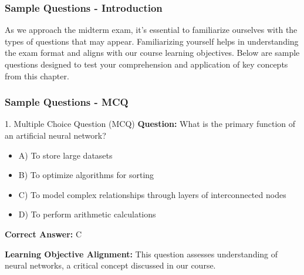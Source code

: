 \documentclass[aspectratio=169]{beamer}
\begin{document}
\begin{frame}[fragile]
    \frametitle{Sample Questions - Introduction}
    As we approach the midterm exam, it's essential to familiarize ourselves with the types of questions that may appear. Familiarizing yourself helps in understanding the exam format and aligns with our course learning objectives. Below are sample questions designed to test your comprehension and application of key concepts from this chapter.
\end{frame}

\begin{frame}[fragile]
    \frametitle{Sample Questions - MCQ}
    \begin{block}{1. Multiple Choice Question (MCQ)}
        \textbf{Question:} What is the primary function of an artificial neural network?
        \begin{itemize}
            \item A) To store large datasets
            \item B) To optimize algorithms for sorting
            \item C) To model complex relationships through layers of interconnected nodes
            \item D) To perform arithmetic calculations
        \end{itemize}
        \textbf{Correct Answer:} C
    \end{block}
    \textbf{Learning Objective Alignment:} This question assesses understanding of neural networks, a critical concept discussed in our course.
\end{frame}
\end{document}
